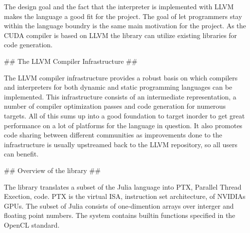 \begin{markdown}
The design goal and the fact that the interpreter is implemented with
LLVM makes the language a good fit for the project. The goal of let
programmers stay within the language boundry is the same main
motivation for the project. As the CUDA compiler is based on LLVM the
library can utilize existing libraries for code generation. 

## The LLVM Compiler Infrastructure ##

The LLVM compiler infrastructure provides a robust basis on which
compilers and interpreters for both dynamic and static programming
languages can be implemented. This infrastructure consists of an
intermediate representation, a number of compiler optimization passes
and code generation for numerous targets. All of this sums up into a
good foundation to target inorder to get great performance on a lot of
platforms for the language in question. It also promotes code sharing
between different communities as improvements done to the
infrastructure is usually upstreamed back to the LLVM repository, so
all users can benefit.

## Overview of the library ##

The library translates a subset of the Julia language into PTX,
Parallel Thread Exection, code. PTX is the virtual ISA, instruction
set architecture, of NVIDIAs GPUs. The subset of Julia consists of
one-dimention arrays over interger and floating point numbers. The
system contains builtin functions specified in the OpenCL standard.


\end{markdown}
